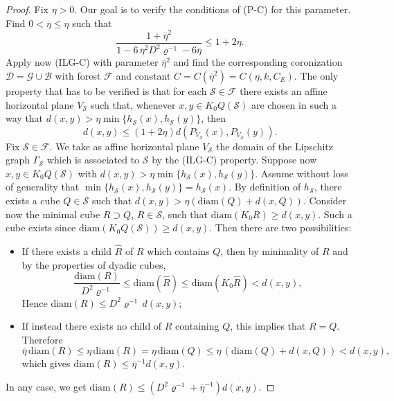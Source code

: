 \documentclass[12pt]{amsart}
\renewcommand{\rho}{\varrho}
\numberwithin{equation}{section}
\theoremstyle{plain}
\theoremstyle{definition}
\theoremstyle{remark}
\begin{document}
\begin{proof}
Fix $\eta>0$. Our goal is to verify the conditions of (P-C) for this parameter. Find $0<\overline{\eta}\leq \eta$ such that \begin{equation}\label{etabar}\frac{1+\overline \eta^2}{1-6\,\overline \eta^2D^2\rho^{-1}-6\overline \eta}\leq 1+2\eta.\end{equation} Apply now (ILG-C) with parameter $\overline{\eta}^2$ and find the corresponding coronization $\mathcal{D}=\mathcal{G} \dot{\cup}\mathcal{B}$ with forest $\mathcal{F}$ and  constant $C=C(\overline{\eta}^2)=C(\eta,k,C_E)$.
The only property that has to be verified is that for each $\mathcal S\in\mathcal F$ there exists an affine horizontal plane $V_\mathcal S$ such that, whenever $x,y\in {K_0}Q(\mathcal S)$ are chosen in such a way that $d(x,y)>\eta\min\{h_\mathcal S(x),h_\mathcal S(y)\}$, then 
\begin{equation}\label{eq:GoalHorizPlaneCorona}
     d(x,y)\leq (1+2\eta)d(P_{V_\mathcal S}(x), P_{V_\mathcal S}(y)).
     \end{equation}
  Fix $\mathcal S\in\mathcal F$. We take as affine horizontal plane $V_\mathcal S$ the domain of the Lipschitz graph $\Gamma_\mathcal S$ which is associated to $\mathcal{S}$ by the (ILG-C) property. Suppose now $x,y\in {K_0}Q(\mathcal S)$ with $d(x,y)>\eta\min\{h_\mathcal S(x),h_\mathcal S(y)\}$. Assume without loss of generality that $\min\{h_\mathcal S(x),h_\mathcal S(y)\}=h_\mathcal S(x)$. By definition of $h_\mathcal S$, there exists a cube $Q\in\mathcal S$ such that $d(x,y)>\eta (\mathrm{diam}(Q)+d(x,Q))$. Consider now the minimal cube $R\supset Q$, $R\in \mathcal{S}$, such that $\mathrm{diam}({K_0}R)\geq d(x,y)$. Such a cube exists since $\mathrm{diam}({K_0}Q(\mathcal S))\geq d(x,y)$. Then there are two possibilities:
  \begin{itemize}
      \item If there exists a child $\widehat R$ of $R$ which contains $Q$, then by minimality of $R$ and by the properties of dyadic cubes,
      \[\frac{\mathrm{diam}(R)}{D^2\rho^{-1}}\leq \mathrm{diam}(\widehat R){\leq \mathrm{diam}(K_0\widehat R)}< d(x,y),\] %
      Hence $\mathrm{diam}(R)\leq D^2\rho^{-1} \,d(x,y)$;
      \item If instead there exists no child of $R$ containing $Q$, this implies that $R=Q$. Therefore
      \[\overline\eta\, \mathrm{diam}(R)\leq \eta \,\mathrm{diam}(R)=\eta \,\mathrm{diam}(Q)\leq \eta\,(\mathrm{diam}(Q)+d(x,Q))<d(x,y),\]
      which gives $\mathrm{diam}(R)\leq \overline\eta^{-1}d(x,y)$.
  \end{itemize}
  In any case, we get $\mathrm{diam}(R)\leq (D^2\rho^{-1}+\overline\eta^{-1})d(x,y)$. 
  

\end{proof}
\end{document}
